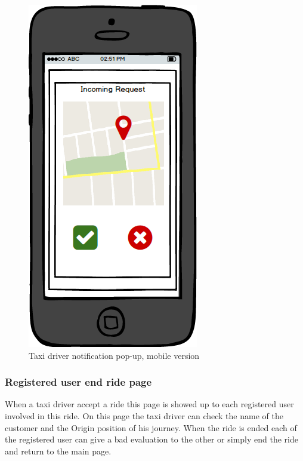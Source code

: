 				\begin{figure}[H]
					\centering
					\includegraphics[scale=0.4]{IMG/UserInterfaces/notificationTaxiDriver_m.png}
					\caption{Taxi driver notification pop-up, mobile version}\label{requestNotification_m}
				\end{figure}
				
			
			\subsubsection{Registered user end ride page}
			When a taxi driver accept a ride this page is showed up to each registered user involved in this ride. On this page the taxi driver can check the name of the customer and the Origin position of his journey. When the ride is ended each of the registered user can give a bad evaluation to the other or simply end the ride and return to the main page.
				
